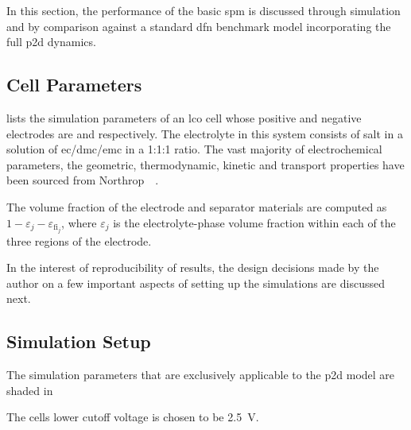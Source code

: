 
In this  section, the performance  of the  basic \gls{spm} is  discussed through
simulation  and  by comparison  against  a  standard \gls{dfn}  benchmark  model
incorporating the full \gls{p2d} dynamics.

\subsection{Cell Parameters}


 lists  the simulation  parameters of  an \gls{lco}
cell  whose positive  and negative  electrodes are   and  
respectively.   The  electrolyte   in  this   system  consists   of  
salt  in   a  solution  of   \gls{ec}/\gls{dmc}/\gls{emc}  in  a   1:1:1  ratio.
The  vast   majority  of  electrochemical  parameters,   \viz{}  the  geometric,
thermodynamic,  kinetic   and  transport  properties  have   been  sourced  from
Northrop~\etal{}~\cite{Northrop2011}.

The volume fraction of the electrode  and separator materials are computed as $1
-  \varepsilon_j  -  \varepsilon_{\text{fi}_j}$, where  $\varepsilon_j$  is  the
electrolyte-phase  volume fraction  within  each  of the  three  regions of  the
electrode.


In the interest of reproducibility of  results, the design decisions made by the
author on  a few important aspects  of setting up the  simulations are discussed
next.

\subsection{Simulation Setup}
The simulation parameters that are exclusively applicable to the \gls{p2d}
model are shaded in

The cells lower cutoff voltage is chosen to be \SI{2.5}{V}.
